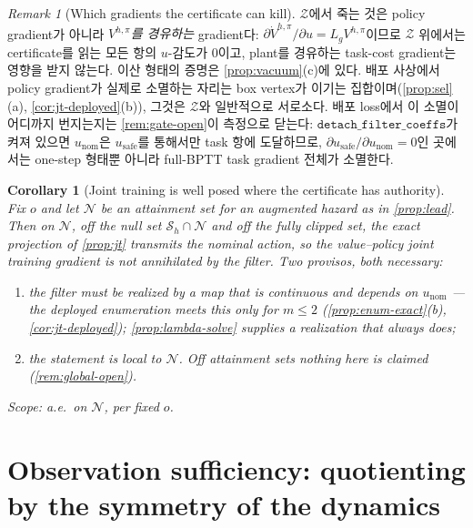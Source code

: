 \documentclass[11pt]{article}
\theoremstyle{plain}
\newtheorem{corollary}[theorem]{Corollary}
\theoremstyle{definition}
\theoremstyle{remark}
\newtheorem{remark}[theorem]{Remark}
\newcommand{\Vhp}[1]{V^{h,#1}}
\newcommand{\Vhpi}{\Vhp{\pi}}
\newcommand{\Lg}{L_g}
\begin{document}
\begin{remark}[Which gradients the certificate can kill]\label{rem:gradchannel}
$\mathcal Z$에서 죽는 것은 policy gradient가 아니라 \emph{$\Vhpi$를 경유하는} gradient다:
$\partial\dot\Vhpi/\partial u=\Lg\Vhpi$이므로 $\mathcal Z$ 위에서는 certificate를 읽는 모든 항의
$u$-감도가 $0$이고, plant를 경유하는 task-cost gradient는 영향을 받지 않는다. 이산 형태의 증명은
\cref{prop:vacuum}(c)에 있다. 배포 사상에서 policy gradient가 실제로 소멸하는 자리는 box vertex가
이기는 집합이며(\cref{prop:sel}(a), \cref{cor:jt-deployed}(b)), 그것은 $\mathcal Z$와 일반적으로
서로소다. 배포 loss에서 이 소멸이 어디까지 번지는지는 \cref{rem:gate-open}이 측정으로 닫는다:
$\texttt{detach\_filter\_coeffs}$가 켜져 있으면 $u_{\mathrm{nom}}$은 $u_{\mathrm{safe}}$를 통해서만
task 항에 도달하므로, $\partial u_{\mathrm{safe}}/\partial u_{\mathrm{nom}}=0$인 곳에서는 one-step
형태뿐 아니라 full-BPTT task gradient 전체가 소멸한다.
\end{remark}

\begin{corollary}[Joint training is well posed where the certificate has authority]\label{cor:main}
Fix $o$ and let $\mathcal N$ be an attainment set for an augmented hazard as in
\cref{prop:lead}. Then on $\mathcal N$, off the null set $\mathcal S_h\cap\mathcal N$ and off
the fully clipped set, the exact projection of \cref{prop:jt} transmits the nominal action, so
the value--policy joint training gradient is not annihilated by the filter. Two provisos, both
necessary:
\begin{enumerate}[label=(\roman*)]
  \item the filter must be realized by a map that is continuous and depends on
  $u_{\mathrm{nom}}$ --- the deployed enumeration meets this only for $m\le2$
  (\cref{prop:enum-exact}(b), \cref{cor:jt-deployed}); \cref{prop:lambda-solve} supplies a
  realization that always does;
  \item the statement is local to $\mathcal N$. Off attainment sets nothing here is claimed
  (\cref{rem:global-open}).
\end{enumerate}
Scope: a.e.\ on $\mathcal N$, per fixed $o$.
\end{corollary}

\section{Observation sufficiency: quotienting by the symmetry of the dynamics}\label{sec:obs}
\end{document}

